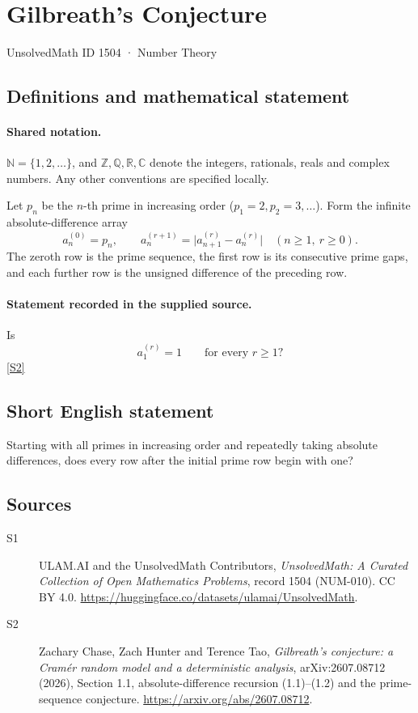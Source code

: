 \documentclass[11pt]{article}
\newcommand{\sref}[2]{\hyperlink{source:#1:#2}{[S#2]}}
\begin{document}
\setcounter{section}{1503}
\section{Gilbreath's Conjecture}\label{1504}
{\small\sffamily UnsolvedMath ID 1504 · Number Theory}
\subsection{Definitions and mathematical statement}

\paragraph{Shared notation.}$\mathbb N=\{1,2,\ldots\}$, and $\mathbb Z,\mathbb Q,\mathbb R,\mathbb C$ denote the integers, rationals, reals and complex numbers. Any other conventions are specified locally.


Let \(p_n\) be the \(n\)-th prime in increasing order
(\(p_1=2,p_2=3,\ldots\)). Form the infinite absolute-difference array
\[
 a_n^{(0)}=p_n,\qquad
 a_n^{(r+1)}=\bigl|a_{n+1}^{(r)}-a_n^{(r)}\bigr|
                  \quad(n\ge1,\ r\ge0).
\]
The zeroth row is the prime sequence, the first row is its consecutive
prime gaps, and each further row is the unsigned difference of the preceding row.
\paragraph{Statement recorded in the supplied source.}
Is
\[
                         a_1^{(r)}=1\qquad\text{for every }r\ge1?
\] \sref{1504}{2}
\subsection{Short English statement}
Starting with all primes in increasing order and repeatedly taking absolute differences, does every row after the initial prime row begin with one?
\subsection{Sources}
\begin{description}
\item[\hypertarget{source:1504:1}{S1}] ULAM.AI and the UnsolvedMath Contributors, \emph{UnsolvedMath: A Curated Collection of Open Mathematics Problems}, record 1504 (NUM-010). CC BY 4.0. \url{https://huggingface.co/datasets/ulamai/UnsolvedMath}.
\item[\hypertarget{source:1504:2}{S2}] Zachary Chase, Zach Hunter and Terence Tao, \emph{Gilbreath's conjecture: a Cram\'er random model and a deterministic analysis}, arXiv:2607.08712 (2026), Section 1.1, absolute-difference recursion (1.1)--(1.2) and the prime-sequence conjecture. \url{https://arxiv.org/abs/2607.08712}.
\end{description}
\label{end:1504}
\end{document}
